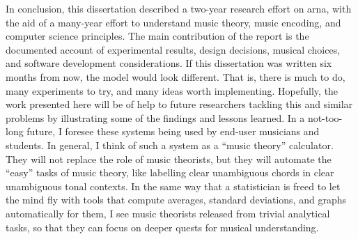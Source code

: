 
In conclusion, this dissertation described a two-year
research effort on \gls{arna}, with the aid of a many-year
effort to understand music theory, music encoding, and
computer science principles. The main contribution of the
report is the documented account of experimental results,
design decisions, musical choices, and software development
considerations. If this dissertation was written six months
from now, the model would look different. That is, there is
much to do, many experiments to try, and many ideas worth
implementing. Hopefully, the work presented here will be of
help to future researchers tackling this and similar
problems by illustrating some of the findings and lessons
learned. In a not-too-long future, I foresee these systems
being used by end-user musicians and students. In general, I
think of such a system as a ``music theory'' calculator.
They will not replace the role of music theorists, but they
will automate the ``easy'' tasks of music theory, like
labelling clear unambiguous chords in clear unambiguous
tonal contexts. In the same way that a statistician is freed
to let the mind fly with tools that compute averages,
standard deviations, and graphs automatically for them, I
see music theorists released from trivial analytical tasks,
so that they can focus on deeper quests for musical
understanding.
